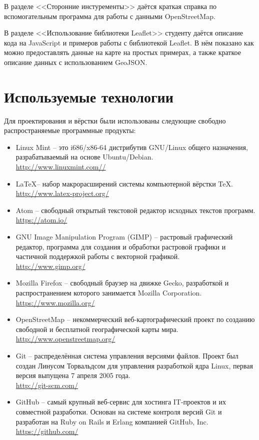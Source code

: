 \documentclass[a4paper, 14pt]{extreport}
\begin{document}
    В разделе <<Сторонние инстуременты>> даётся краткая справка по вспомогательным программа для 
    работы с данными OpenStreetMap. 

    В разделе <<Использование библиотеки Leaflet>> студенту даётся описание кода на JavaScript и 
    примеров работы с библиотекой Leaflet. В нём показано как можно предоставлять данные на 
    карте на простых примерах, а также краткое описание данных с использованием GeoJSON.

    \newpage

    \chapter{Используемые технологии}
    Для проектирования и вёрстки были использованы следующие свободно распространяемые программные 
    продукты:
    \begin{itemize}
        \item Linux Mint -- это i686/x86-64 дистрибутив GNU/Linux общего 
            назначения, разрабатываемый на основе Ubuntu/Debian.\\
            \url{http://www.linuxmint.com//}
        \item \LaTeX -- набор макрорасширений системы компьютерной вёрстки TeX.\\
            \url{http://www.latex-project.org/}
        \item Atom -- свободный открытый текстовой редактор исходных текстов программ.
            \hspace{1ex} \url{https://atom.io/}
        \item GNU Image Manipulation Program (GIMP) -- растровый графический редактор, программа для 
            создания и обработки растровой графики и частичной поддержкой работы с векторной графикой.\\
            \url{http://www.gimp.org/}
        \item Mozilla Firefox -- свободный браузер на движке Gecko, разработкой и распространением 
            которого занимается Mozilla Corporation.\\
            \url{https://www.mozilla.org/}
        \item OpenStreetMap -- некоммерческий веб-картографический проект по созданию свободной и 
            бесплатной географической карты мира.\\
            \url{http://www.openstreetmap.org/}
        \item Git -- распределённая система управления версиями файлов. Проект был создан Линусом 
            Торвальдсом для управления разработкой ядра Linux, первая версия выпущена 7 апреля 2005 года.\\
            \url{http://git-scm.com/}
        \item GitHub -- самый крупный веб-сервис для хостинга IT-проектов и их совместной разработки. 
            Основан на системе контроля версий Git и разработан на Ruby on Rails и Erlang компанией 
            GitHub, Inc.\\
            \url{https://github.com/}
    \end{itemize}
\end{document}

